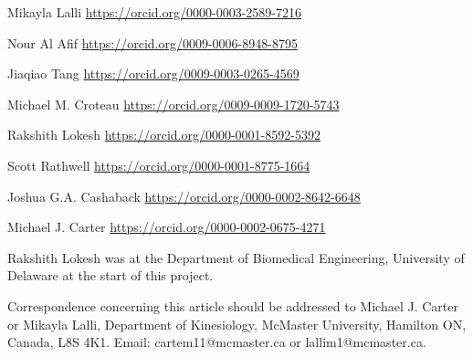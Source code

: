 \documentclass[
  11pt,
  letterpaper,
]{article}
\begin{document}
\begin{titlepage}
\hspace*{1.27cm}Mikayla
Lalli  \url{https://orcid.org/0000-0003-2589-7216} \par
\hspace*{1.27cm}Nour Al
Afif  \url{https://orcid.org/0009-0006-8948-8795} \par
\hspace*{1.27cm}Jiaqiao
Tang  \url{https://orcid.org/0009-0003-0265-4569} \par
\hspace*{1.27cm}Michael M.
Croteau  \url{https://orcid.org/0009-0009-1720-5743} \par
\hspace*{1.27cm}Rakshith
Lokesh  \url{https://orcid.org/0000-0001-8592-5392} \par
\hspace*{1.27cm}Scott
Rathwell  \url{https://orcid.org/0000-0001-8775-1664} \par
\hspace*{1.27cm}Joshua G.A.
Cashaback  \url{https://orcid.org/0000-0002-8642-6648} \par
\hspace*{1.27cm}Michael J.
Carter  \url{https://orcid.org/0000-0002-0675-4271} \par

\hspace*{1.27cm}Rakshith Lokesh was at the Department of Biomedical
Engineering, University of Delaware at the start of this project.
\par


\hspace*{1.27cm}Correspondence concerning this article should be
addressed to Michael J. Carter or Mikayla Lalli, Department of
Kinesiology, McMaster University, Hamilton ON, Canada, L8S 4K1. Email:
cartem11@mcmaster.ca or lallim1@mcmaster.ca.
\par

\clearpage


\end{titlepage}
\end{document}
